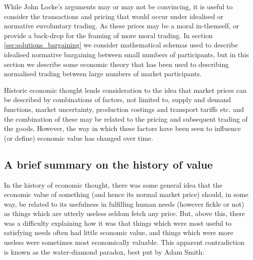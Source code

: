 While John Locke's arguments may or may not be convincing, it is useful to consider the transactions and pricing that would occur under idealised or normative euvoluntary trading.
As these prices may be a moral in-themself, or provide a back-drop for the framing of more moral trading.
In section \ref{sec:solutions_bargaining} we consider mathematical schemas used to describe idealised normative bargaining between small numbers of participants, but in this section we describe some economic theory that has been used to describing normalised trading between large numbers of market participants.

Historic economic thought lends consideration to the idea that market prices can be described by combinations of factors, not limited to, supply and demand functions, market uncertainty, production costings and transport tariffs etc. and the combination of these may be related to the pricing and subsequent trading of the goods.
However, the way in which these factors have been seen to influence (or define) economic value has changed over time.

\subsection{A brief summary on the history of value}

In the history of economic thought, there was some general idea that the economic value of something (and hence its normal market price) should, in some way, be related to its usefulness in fulfilling human needs (however fickle or not) as things which are utterly useless seldom fetch any price.
But, above this, there was a difficulty explaining how it was that things which were most useful to satisfying needs often had little economic value, and things which were more useless were sometimes most economically valuable. This apparent contradiction is known as the water-diamond paradox, best put by Adam Smith:

